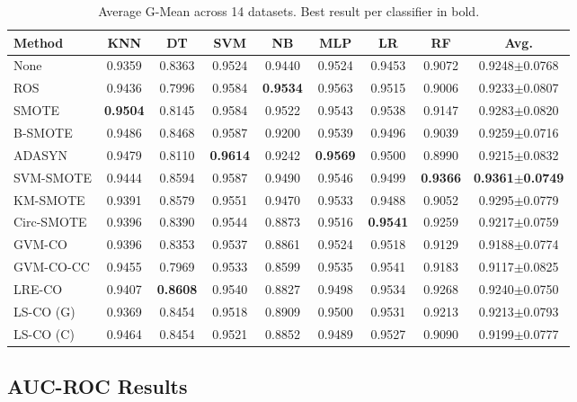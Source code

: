 \begin{table}[H]
\centering
\caption{Average G-Mean across 14 datasets. Best result per classifier in bold.}
\label{tab:results:gmean}
\small
\begin{tabular}{lcccccccc}
\toprule
\textbf{Method} & \textbf{KNN} & \textbf{DT} & \textbf{SVM} & \textbf{NB} & \textbf{MLP} & \textbf{LR} & \textbf{RF} & \textbf{Avg.} \\
\midrule
None       & 0.9359 & 0.8363 & 0.9524 & 0.9440 & 0.9524 & 0.9453 & 0.9072 & 0.9248$\pm$0.0768 \\
ROS        & 0.9436 & 0.7996 & 0.9584 & \textbf{0.9534} & 0.9563 & 0.9515 & 0.9006 & 0.9233$\pm$0.0807 \\
SMOTE      & \textbf{0.9504} & 0.8145 & 0.9584 & 0.9522 & 0.9543 & 0.9538 & 0.9147 & 0.9283$\pm$0.0820 \\
B-SMOTE    & 0.9486 & 0.8468 & 0.9587 & 0.9200 & 0.9539 & 0.9496 & 0.9039 & 0.9259$\pm$0.0716 \\
ADASYN     & 0.9479 & 0.8110 & \textbf{0.9614} & 0.9242 & \textbf{0.9569} & 0.9500 & 0.8990 & 0.9215$\pm$0.0832 \\
SVM-SMOTE  & 0.9444 & 0.8594 & 0.9587 & 0.9490 & 0.9546 & 0.9499 & \textbf{0.9366} & \textbf{0.9361$\pm$0.0749} \\
KM-SMOTE   & 0.9391 & 0.8579 & 0.9551 & 0.9470 & 0.9533 & 0.9488 & 0.9052 & 0.9295$\pm$0.0779 \\
Circ-SMOTE & 0.9396 & 0.8390 & 0.9544 & 0.8873 & 0.9516 & \textbf{0.9541} & 0.9259 & 0.9217$\pm$0.0759 \\
\midrule
GVM-CO     & 0.9396 & 0.8353 & 0.9537 & 0.8861 & 0.9524 & 0.9518 & 0.9129 & 0.9188$\pm$0.0774 \\
GVM-CO-CC  & 0.9455 & 0.7969 & 0.9533 & 0.8599 & 0.9535 & 0.9541 & 0.9183 & 0.9117$\pm$0.0825 \\
LRE-CO     & 0.9407 & \textbf{0.8608} & 0.9540 & 0.8827 & 0.9498 & 0.9534 & 0.9268 & 0.9240$\pm$0.0750 \\
LS-CO (G)  & 0.9369 & 0.8454 & 0.9518 & 0.8909 & 0.9500 & 0.9531 & 0.9213 & 0.9213$\pm$0.0793 \\
LS-CO (C)  & 0.9464 & 0.8454 & 0.9521 & 0.8852 & 0.9489 & 0.9527 & 0.9090 & 0.9199$\pm$0.0777 \\
\bottomrule
\end{tabular}
\end{table}

\subsection{AUC-ROC Results}

